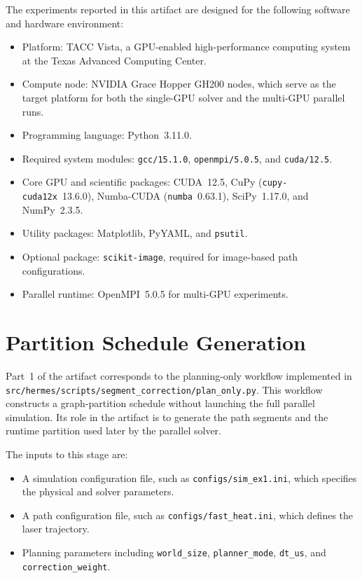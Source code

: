 \documentclass[11pt]{article}
\begin{document}
The experiments reported in this artifact are designed for the following
software and hardware environment:
\begin{itemize}
\item Platform: TACC Vista, a GPU-enabled high-performance computing system at
the Texas Advanced Computing Center.
\item Compute node: NVIDIA Grace Hopper GH200 nodes, which serve as the target
platform for both the single-GPU solver and the multi-GPU parallel runs.
\item Programming language: Python~3.11.0.
\item Required system modules: \texttt{gcc/15.1.0}, \texttt{openmpi/5.0.5},
and \texttt{cuda/12.5}.
\item Core GPU and scientific packages: CUDA~12.5, CuPy
(\texttt{cupy-cuda12x}~13.6.0), Numba-CUDA (\texttt{numba}~0.63.1),
SciPy~1.17.0, and NumPy~2.3.5.
\item Utility packages: Matplotlib, PyYAML, and \texttt{psutil}.
\item Optional package: \texttt{scikit-image}, required for image-based path
configurations.
\item Parallel runtime: OpenMPI~5.0.5 for multi-GPU experiments.
\end{itemize}

\section{Partition Schedule Generation}

Part~1 of the artifact corresponds to the planning-only workflow implemented in
\texttt{src/hermes/scripts/segment\_correction/plan\_only.py}. This workflow
constructs a graph-partition schedule without launching the full parallel
simulation. Its role in the artifact is to generate the path segments and the
runtime partition used later by the parallel solver.

The inputs to this stage are:
\begin{itemize}
\item A simulation configuration file, such as \texttt{configs/sim\_ex1.ini},
which specifies the physical and solver parameters.
\item A path configuration file, such as \texttt{configs/fast\_heat.ini}, which
defines the laser trajectory.
\item Planning parameters including \texttt{world\_size},
\texttt{planner\_mode}, \texttt{dt\_us}, and \texttt{correction\_weight}.
\end{itemize}
\end{document}
